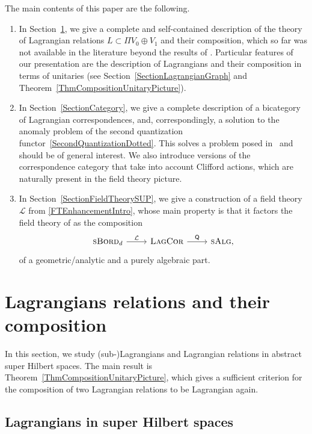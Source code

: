 \documentclass[10pt,a4paper]{amsart}
\numberwithin{equation}{section}
\newcommand{\LagCor}{\textsc{LagCor}}
\newcommand{\sBord}{\textsc{sBord}}
\begin{document}
The main contents of this paper are the following.
\begin{enumerate}\itemsep=0pt
\item[(1)]
In Section~\ref{SectionRelations}, we give a complete and self-contained description of the theory of Lagrangian relations $L \subset \Pi V_0 \oplus V_1$ and their composition, which so far was not available in the literature beyond the results of \cite[Section~2]{LudewigRoos}.
Particular features of our presentation are the description of Lagrangians and their composition in terms of unitaries (see Section~\ref{SectionLagrangianGraph} and Theorem~\ref{ThmCompositionUnitaryPicture}).
\item[(2)]
In Section~\ref{SectionCategory}, we give a complete description of a bicategory of Lagrangian correspondences, and, correspondingly, a solution to the anomaly problem of the second quantization functor~\eqref{SecondQuantizationDotted}.
This solves a problem posed in~\cite{LudewigRoos} and should be of general interest.
We also introduce versions of the correspondence category that take into account Clifford actions, which are naturally present in the field theory picture.
\item[(3)]
In Section~\ref{SectionFieldTheorySUP}, we give a construction of a field theory $\mathcal{L}$ from \eqref{FTEnhancementIntro}, whose main property is that it factors the field theory of \cite{LudewigRoos} as the composition
\begin{equation*}
 \begin{tikzcd}
 \sBord_d \ar[r, "\mathcal{L}"] & \LagCor \ar[r, "\textsf{Q}"] & \textsc{sAlg},
\end{tikzcd}
\end{equation*}
of a geometric/analytic and a purely algebraic part.
\end{enumerate}

\section{Lagrangians relations and their composition}\label{SectionRelations}

In this section, we study (sub-)Lagrangians and Lagrangian relations in abstract super Hilbert spaces.
The main result is Theorem~\ref{ThmCompositionUnitaryPicture}, which gives a sufficient criterion for the composition of two Lagrangian relations to be Lagrangian again.

\subsection{Lagrangians in super Hilbert spaces}
\end{document}
